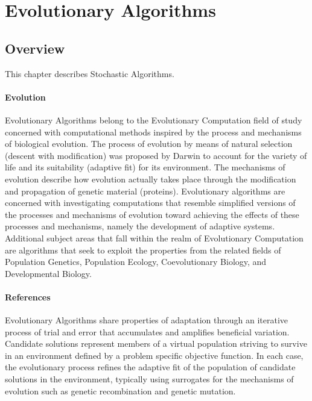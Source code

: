 


\chapter{Evolutionary Algorithms}
\label{ch:evolutionary}

\section{Overview}
This chapter describes Stochastic Algorithms.

\subsubsection{Evolution}
Evolutionary Algorithms belong to the Evolutionary Computation field of study concerned with computational methods inspired by the process and mechanisms of biological evolution. The process of evolution by means of natural selection (descent with modification) was proposed by Darwin to account for the variety of life and its suitability (adaptive fit) for its environment. The mechanisms of evolution describe how evolution actually takes place through the modification and propagation of genetic material (proteins). Evolutionary algorithms are concerned with investigating computations that resemble simplified versions of the processes and mechanisms of evolution toward achieving the effects of these processes and mechanisms, namely the development of adaptive systems.
Additional subject areas that fall within the realm of Evolutionary Computation are algorithms that seek to exploit the properties from the related fields of Population Genetics, Population Ecology, Coevolutionary Biology, and Developmental Biology. 

\subsubsection{References}
Evolutionary Algorithms share properties of adaptation through an iterative process of trial and error that accumulates and amplifies beneficial variation. Candidate solutions represent members of a virtual population striving to survive in an environment defined by a problem specific objective function. In each case, the evolutionary process refines the adaptive fit of the population of candidate solutions in the environment, typically using surrogates for the mechanisms of evolution such as genetic recombination and genetic mutation.

